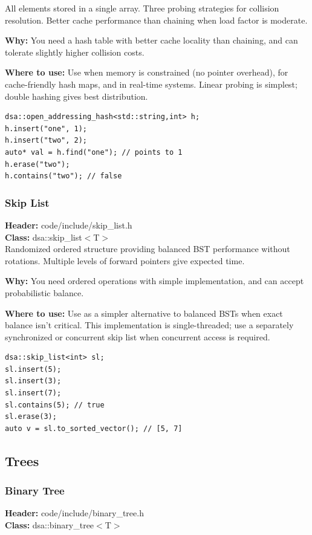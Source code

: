 \documentclass[11pt]{article}
\begin{document}
All elements stored in a single array. Three probing strategies for collision resolution. Better cache performance than chaining when load factor is moderate.

\textbf{Why:} You need a hash table with better cache locality than chaining, and can tolerate slightly higher collision costs. \par \textbf{Where to use:} Use when memory is constrained (no pointer overhead), for cache-friendly hash maps, and in real-time systems. Linear probing is simplest; double hashing gives best distribution.

\begin{lstlisting}
dsa::open_addressing_hash<std::string,int> h;
h.insert("one", 1);
h.insert("two", 2);
auto* val = h.find("one"); // points to 1
h.erase("two");
h.contains("two"); // false
\end{lstlisting}

\subsubsection{Skip List}
\textbf{Header:} code/include/skip\_list.h\\
\textbf{Class:} dsa::skip\_list$<$T$>$\\

Randomized ordered structure providing balanced BST performance without rotations. Multiple levels of forward pointers give expected time.

\textbf{Why:} You need ordered operations with simple implementation, and can accept probabilistic balance. \par \textbf{Where to use:} Use as a simpler alternative to balanced BSTs when exact balance isn't critical. This implementation is single-threaded; use a separately synchronized or concurrent skip list when concurrent access is required.

\begin{lstlisting}
dsa::skip_list<int> sl;
sl.insert(5);
sl.insert(3);
sl.insert(7);
sl.contains(5); // true
sl.erase(3);
auto v = sl.to_sorted_vector(); // [5, 7]
\end{lstlisting}

\subsection{Trees}

\subsubsection{Binary Tree}
\textbf{Header:} code/include/binary\_tree.h\\
\textbf{Class:} dsa::binary\_tree$<$T$>$\\
\end{document}
